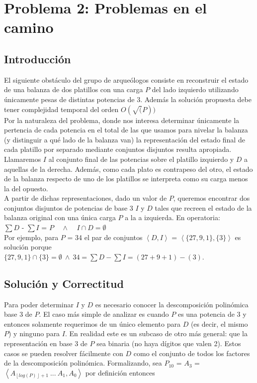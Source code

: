 \section{Problema 2: Problemas en el camino}

\subsection{Introducción}
	El siguiente obstáculo del grupo de arqueólogos consiste en reconstruir el estado de una balanza de dos platillos con una carga $P$ del lado izquierdo utilizando únicamente pesas de distintas potencias de 3. Además la solución propuesta debe tener complejidad temporal del orden $O(\sqrt(P))$
	\\ 

	Por la naturaleza del problema, donde nos interesa determinar únicamente la pertencia de cada potencia en el total de las que usamos para nivelar la balanza (y distinguir a qué lado de la balanza van) la representación del estado final de cada platillo por separado mediante conjuntos disjuntos resulta apropiada. Llamaremos $I$ al conjunto final de las potencias sobre el platillo izquierdo y $D$ a aquellas de la derecha. Además, como cada plato es contrapeso del otro, el estado de la balanza respecto de uno de los platillos se interpreta como su carga menos la del opuesto. 
	\\

	A partir de dichas representaciones, dado un valor de $P$, queremos encontrar dos conjuntos disjuntos de potencias de base 3 $I$ y $D$ tales que recreen el estado de la balanza original con una única carga $P$ a la a izquierda. En operatoria:
	\\

	$\sum D$ - $\sum I$ = $P$ \ \ $\wedge$ \ \ $I \cap D = \emptyset$ 
	\\ 
	
	Por ejemplo, para $P$ = 34 el par de conjuntos $\left \langle D,I  \right \rangle$ = $\left \langle \{27,9,1\},\{3\}  \right \rangle$ es solución porque \\
	$\{27,9,1\} \cap \{3\} = \emptyset \ \wedge \ 34 = \sum D - \sum I = (27+9+1)-(3)$.
	\\
	
	

\newpage 
\subsection{Solución y Correctitud}
	Para poder determinar $I$ y $D$ es necesario conocer la descomposición polinómica base 3 de $P$. El caso más simple de analizar es cuando $P$ es una potencia de 3 y entonces solamente requerimos de un único elemento para $D$ (es decir, el mismo $P$) y ninguno para $I$. En realidad este es un subcaso de otro más general: que la representación en base 3 de $P$ sea binaria (no haya dígitos que valen 2). Estos casos se pueden resolver fácilmente con $D$ como el conjunto de todos los factores de la descomposición polinómica. Formalizando, sea $P_{10}$ = $A_3$ = $\left \langle A_{ \left \lfloor{log(P)}\right \rfloor + 1 } \ ... \ A_1, A_0  \right \rangle$ por definición entonces \\
	

